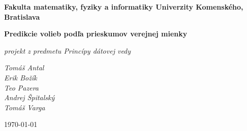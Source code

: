 \documentclass[12pt,oneside,a4paper,slovak]{article}
\begin{document}
	\setcounter{section}{0}
	\begin{titlepage}
		\large
		
		\begin{center}
			\textbf{Fakulta matematiky, fyziky a informatiky Univerzity Komenského, Bratislava}
			
			\vspace{7.5cm}
			
			\LARGE\textbf{ Predikcie volieb podľa prieskumov verejnej mienky }
			
			\vspace{1cm}
			
			\large\textit{projekt z predmetu Princípy dátovej vedy}
			
			\bigskip 
		\end{center}
			
		\vfill
		
		\begin{minipage}{0.5\textwidth}
			\raggedright
			
			\textit{Tomáš Antal\\Erik Božík\\Teo Pazera\\Andrej Špitalský\\Tomáš Varga}
		\end{minipage}
		\hfil
		\begin{minipage}{0.5\textwidth}
			\raggedleft
			\vspace{2.6cm}
			\today
		\end{minipage}
			
	\end{titlepage}
	
	\tableofcontents
	\newpage
	
	
	\newpage
	
	
	\newpage
	
	\newpage
	
	\newpage
	
	\newpage
	
	\newpage
	
	
\end{document}

